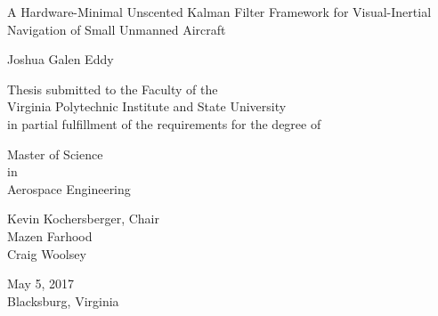 \thispagestyle{empty}

\begin{center}
\begin{doublespacing}
{\Large 
A Hardware-Minimal Unscented Kalman Filter Framework for Visual-Inertial Navigation of Small Unmanned Aircraft
}
\vfill
\end{doublespacing}

Joshua Galen Eddy

\vfill

Thesis submitted to the Faculty of the \\
Virginia Polytechnic Institute and State University \\
in partial fulfillment of the requirements for the degree of

\vfill

Master of Science \\
in \\
Aerospace Engineering

\vfill

Kevin Kochersberger, Chair \\
Mazen Farhood \\
Craig Woolsey

\vfill

May 5, 2017 \\
Blacksburg, Virginia
\vfill
\end{center}

\pagebreak